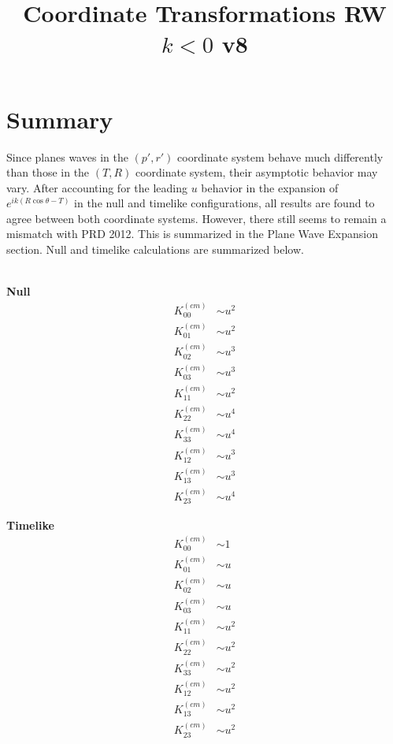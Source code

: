 \documentclass[10pt,letterpaper]{article}
\title{Coordinate Transformations RW $k<0$ v8}
\date{}
\begin{document}
 
\maketitle
\noindent 
\section*{Summary}
Since planes waves in the $(p',r')$ coordinate system behave much differently than those in the $(T,R)$ coordinate system, their asymptotic behavior may vary. After accounting for the leading $u$ behavior in the expansion of $e^{ik(R\cos\theta-T)}$ in the null and timelike configurations, all results are found to agree between both coordinate systems. However, there still seems to remain a mismatch with PRD 2012. This is summarized in the Plane Wave Expansion section. Null and timelike calculations are summarized below.
\\ \\
\begin{minipage}[t]{0.45\textwidth}
\textbf{Null}
\begin{align}
K^{(cm)}_{00} &\sim u^2 \nonumber\\
K^{(cm)}_{01} &\sim  u^2\nonumber\\
K^{(cm)}_{02} &\sim  u^3\nonumber\\
K^{(cm)}_{03} &\sim   u^3\nonumber\\
K^{(cm)}_{11} &\sim  u^2\nonumber\\
K^{(cm)}_{22} &\sim  u^4\nonumber\\
K^{(cm)}_{33} &\sim  u^4\nonumber\\
K^{(cm)}_{12} &\sim u^3\nonumber\\
K^{(cm)}_{13} &\sim u^3\nonumber\\
K^{(cm)}_{23} &\sim u^4
\end{align}
\end{minipage}
\begin{minipage}[t]{0.45\textwidth}
\textbf{Timelike}
\begin{align}
K^{(cm)}_{00} &\sim 1 \nonumber\\
K^{(cm)}_{01} &\sim  u\nonumber\\
K^{(cm)}_{02} &\sim  u\nonumber\\
K^{(cm)}_{03} &\sim   u\nonumber\\
K^{(cm)}_{11} &\sim  u^2\nonumber\\
K^{(cm)}_{22} &\sim  u^2\nonumber\\
K^{(cm)}_{33} &\sim  u^2\nonumber\\
K^{(cm)}_{12} &\sim u^2\nonumber\\
K^{(cm)}_{13} &\sim u^2\nonumber\\
K^{(cm)}_{23} &\sim u^2
\end{align}
\end{minipage}
\end{document}
